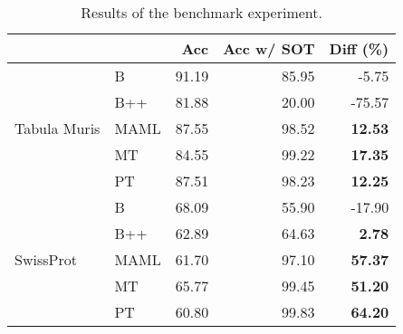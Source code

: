 \begin{table}[h]
\caption{Results of the benchmark experiment.}
\label{tab:results}
\centering
\begin{tabular}{llrrr}
\toprule
 &  & Acc & Acc w/ SOT & Diff (\%) \\
\midrule
\multirow[c]{5}{*}{Tabula Muris} & B & 91.19 & 85.95 & -5.75 \\
 & B++ & 81.88 & 20.00 & -75.57 \\
 & MAML & 87.55 & 98.52 & \bfseries 12.53 \\
 & MT & 84.55 & 99.22 & \bfseries 17.35 \\
 & PT & 87.51 & 98.23 & \bfseries 12.25 \\
\midrule
\multirow[c]{5}{*}{SwissProt} & B & 68.09 & 55.90 & -17.90 \\
 & B++ & 62.89 & 64.63 & \bfseries 2.78 \\
 & MAML & 61.70 & 97.10 & \bfseries 57.37 \\
 & MT & 65.77 & 99.45 & \bfseries 51.20 \\
 & PT & 60.80 & 99.83 & \bfseries 64.20 \\
\bottomrule
\end{tabular}
\end{table}